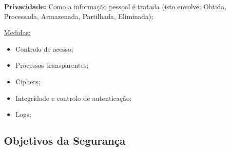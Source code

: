 \documentclass{article}
\begin{document}
\begin{flushleft}
  \vspace{2mm}

  \textbf{Privacidade:} Como a informação pessoal é tratada (isto envolve:
  Obtida, Processada, Armazenada, Partilhada, Eliminada);

  \vspace{2mm}

  \uline{Medidas:}
  \begin{itemize}
    \item Controlo de acesso;
    \item Processos transparentes;
    \item Ciphers;
    \item Integridade e controlo de autenticação;
    \item Logs;
  \end{itemize}
\end{flushleft}

\subsection{Objetivos da Segurança}
\end{document}
